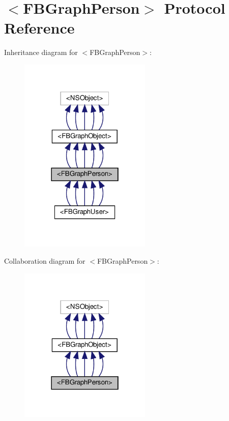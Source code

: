 \hypertarget{protocolFBGraphPerson-p}{}\section{$<$F\+B\+Graph\+Person$>$ Protocol Reference}
\label{protocolFBGraphPerson-p}


Inheritance diagram for $<$F\+B\+Graph\+Person$>$\+:
\nopagebreak
\begin{figure}[H]
\begin{center}
\leavevmode
\includegraphics[width=178pt]{protocolFBGraphPerson-p__inherit__graph}
\end{center}
\end{figure}


Collaboration diagram for $<$F\+B\+Graph\+Person$>$\+:
\nopagebreak
\begin{figure}[H]
\begin{center}
\leavevmode
\includegraphics[width=178pt]{protocolFBGraphPerson-p__coll__graph}
\end{center}
\end{figure}
